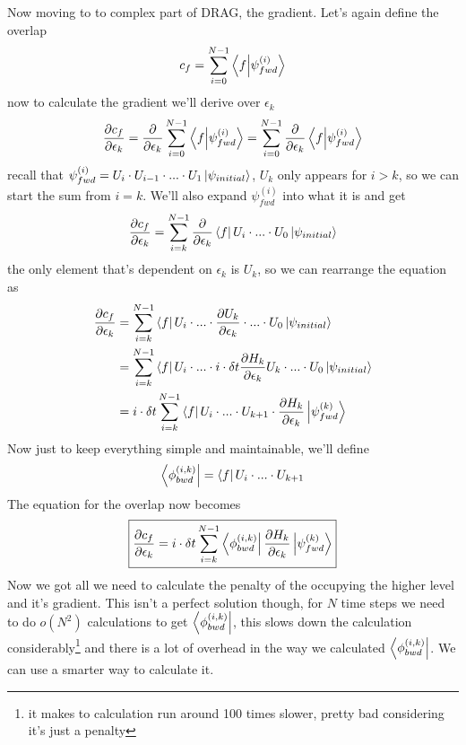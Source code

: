 \documentclass[english, a4paper, 12pt, twoside]{article}
\numberwithin{equation}{section} %
\begin{document}
Now moving to to complex part of DRAG, the gradient. Let's again define the overlap
\[
    c_{f} = \sum_{i=0}^{N - 1} \braket{f}{\psi_{fwd}^{(i)}}
\]
now to calculate the gradient we'll derive over \(\epsilon_k\)
\[
    \frac{\partial c_{f}}{\partial \epsilon_k} = \frac{\partial}{\partial \epsilon_k}\sum_{i=0}^{N - 1}  \braket{f}{\psi_{fwd}^{(i)}} = \sum_{i=0}^{N - 1} \frac{\partial}{\partial \epsilon_k} \braket{f}{\psi_{fwd}^{(i)}}
\]
recall that \(\psi_{fwd}^{(i)} = U_i \cdot U_{i-1} \cdot ... \cdot U_1 \ket{\psi_{initial}}\), \(U_k\) only appears for \(i > k\), so we can start the sum from $i = k$. We'll also expand $\psi_{fwd}^{(i)}$ into what it is and get
\[
    \frac{\partial c_{f}}{\partial \epsilon_k} = \sum_{i=k}^{N - 1} \frac{\partial}{\partial \epsilon_k} \bra{f}U_i \cdot ... \cdot U_0 \ket{\psi_{initial}}
\]
the only element that's dependent on $\epsilon_k$ is $U_k$, so we can rearrange the equation as
\begin{align*}
    \frac{\partial c_{f}}{\partial \epsilon_k} &= \sum_{i=k}^{N - 1} \bra{f}U_i \cdot ...\cdot \frac{\partial U_k}{\partial \epsilon_k} \cdot ... \cdot U_0 \ket{\psi_{initial}} \\
    &= \sum_{i=k}^{N - 1} \bra{f}U_i \cdot ...\cdot i \cdot \delta t\frac{\partial H_k}{\partial \epsilon_k} U_k\cdot ... \cdot U_0 \ket{\psi_{initial}} \\
    &= i \cdot \delta t \sum_{i=k}^{N - 1} \bra{f}U_i \cdot ... \cdot U_{k+1} \cdot \frac{\partial H_k}{\partial \epsilon_k}\ket{\psi_{fwd}^{(k)}}
\end{align*}
Now just to keep everything simple and maintainable, we'll define
\[
    \bra{\phi_{bwd}^{(i,k)}} = \bra{f} U_i \cdot ... \cdot U_{k+1}
\]
The equation for the overlap now becomes
\[
    \boxed{\frac{\partial c_{f}}{\partial \epsilon_k} = i \cdot \delta t \sum_{i=k}^{N - 1} \bra{\phi_{bwd}^{(i,k)}} \frac{\partial H_k}{\partial \epsilon_k} \ket{\psi_{fwd}^{(k)}}}
\]
Now we got all we need to calculate the penalty of the occupying the higher level and it's gradient. This isn't a perfect solution though, for $N$ time steps we need to do $o(N^2)$ calculations to get $\bra{\phi_{bwd}^{(i,k)}}$, this slows down the calculation considerably\footnote{it makes to calculation run around 100 times slower, pretty bad considering it's just a penalty} and there is a lot of overhead in the way we calculated $\bra{\phi_{bwd}^{(i,k)}}$. We can use a smarter way to calculate it.
\end{document}
